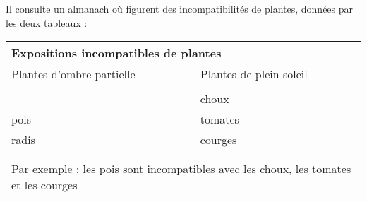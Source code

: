 \documentclass[]{prof}
\begin{document}
\medskip
Il consulte un almanach où figurent des incompatibilités de plantes, données par les deux tableaux :

\medskip

\begin{minipage}[t]{0.46\textwidth}
\begin{tabular}{|l|l|}\hline
    \multicolumn{2}{|p{7cm}|}{Expositions incompatibles de plantes}\\
\hline
    \multicolumn{1}{|p{3.5cm}|}{Plantes d'ombre partielle}
    &\multicolumn{1}{|p{3.5cm}|}{Plantes de plein soleil}\\ 
\hline
    &                       \\
    &   choux               \\
        pois    &   tomates \\
        radis   &   courges \\
    &                       \\
    &                       \\ 
\hline
    \multicolumn{2}{|p{7cm}|}{Par exemple : les pois sont incompatibles avec les
    choux, les tomates et les courges}\\ \hline
\end{tabular}
\end{minipage}
\hfill
{}

\medskip
\end{document}

